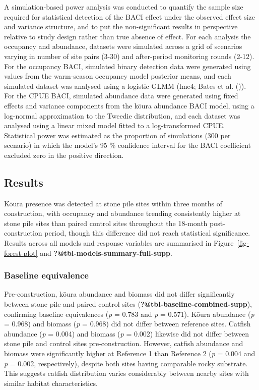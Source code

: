 \documentclass[
  letterpaper,
  DIV=11,
  numbers=noendperiod]{scrartcl}
\begin{document}
A simulation-based power analysis was conducted to quantify the sample
size required for statistical detection of the BACI effect under the
observed effect size and variance structure, and to put the
non-significant results in perspective relative to study design rather
than true absence of effect. For each analysis the occupancy and
abundance, datasets were simulated across a grid of scenarios varying in
number of site pairs (3-30) and after-period monitoring rounds (2-12).
For the occupancy BACI, simulated binary detection data were generated
using values from the warm-season occupancy model posterior means, and
each simulated dataset was analysed using a logistic GLMM (lme4; Bates
et al. ()). For the CPUE BACI, simulated
abundance data were generated using fixed effects and variance
components from the kōura abundance BACI model, using a log-normal
approximation to the Tweedie distribution, and each dataset was analysed
using a linear mixed model fitted to a log-transformed CPUE. Statistical
power was estimated as the proportion of simulations (300 per scenario)
in which the model's 95 \% confidence interval for the BACI coefficient
excluded zero in the positive direction.

\subsection{Results}\label{results}

Kōura presence was detected at stone pile sites within three months of
construction, with occupancy and abundance trending consistently higher
at stone pile sites than paired control sites throughout the 18-month
post-construction period, though this difference did not reach
statistical significance. Results across all models and response
variables are summarised in Figure~\ref{fig-forest-plot} and
{\textbf{?@tbl-models-summary-full-supp}}.

\subsubsection{Baseline equivalence}\label{baseline-equivalence}

Pre-construction, kōura abundance and biomass did not differ
significantly between stone pile and paired control sites
({\textbf{?@tbl-baseline-combined-supp}}), confirming baseline
equivalences (\emph{p} = 0.783 and \emph{p} = 0.571). Kōura abundance
(\emph{p} = 0.968) and biomass (\emph{p} = 0.968) did not differ between
reference sites. Catfish abundance (\emph{p} = 0.004) and biomass
(\emph{p} = 0.002) likewise did not differ between stone pile and
control sites pre-construction. However, catfish abundance and biomass
were significantly higher at Reference 1 than Reference 2 (\emph{p} =
0.004 and \emph{p} = 0.002, respectively), despite both sites having
comparable rocky substrate. This suggests catfish distribution varies
considerably between nearby sites with similar habitat characteristics.
\end{document}
